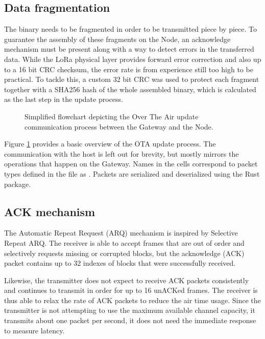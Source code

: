\subsection{Data fragmentation}
The binary needs to be fragmented in order to be transmitted piece by piece. To guarantee the assembly of these fragments on the Node, an acknowledge mechanism must be present along with a way to detect errors in the transferred data. While the LoRa physical layer provides forward error correction and also up to a 16 bit CRC checksum, the error rate is from experience still too high to be practical. To tackle this, a custom 32 bit CRC was used to protect each fragment together with a SHA256 hash of the whole assembled binary, which is calculated as the last step in the update process.

\begin{figure}[p]
    
    \caption{\label{fig:ota-algo}Simplified flowchart depicting the Over The Air update communication process between the Gateway and the Node.}
\end{figure}

Figure \ref{fig:ota-algo} provides a basic overview of the OTA update process. The communication with the host is left out for brevity, but mostly mirrors the operations that happen on the Gateway. Names in the cells correspond to packet types defined in the  file as . Packets are serialized and deserialized using the  Rust package.

\subsection{ACK mechanism}
The Automatic Repeat Request (ARQ) mechanism is inspired by Selective Repeat ARQ. The receiver is able to accept frames that are out of order and selectively requests missing or corrupted blocks, but the acknowledge (ACK) packet contains up to 32 indexes of blocks that were successfully received. 

Likewise, the transmitter does not expect to receive ACK packets consistently and continues to transmit in order for up to 16 unACKed frames. The receiver is thus able to relax the rate of ACK packets to reduce the air time usage. Since the transmitter is not attempting to use the maximum available channel capacity, it transmits about one packet per second, it does not need the immediate response to measure latency.

